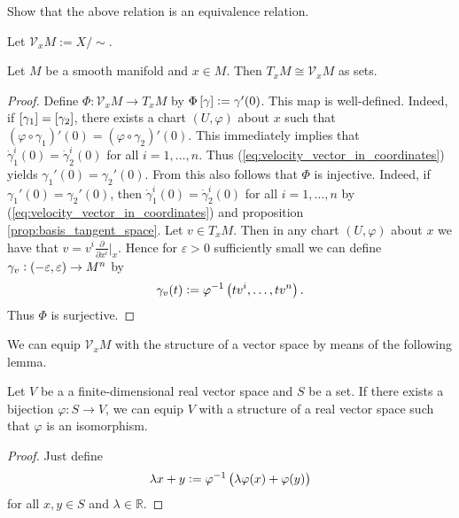 \begin{exercise}
	Show that the above relation is an equivalence relation.
\end{exercise}

Let $\mathcal{V}_xM := X/{\sim}$.

\begin{proposition}
	Let $M$ be a smooth manifold and $x \in M$. Then $T_xM \cong \mathcal{V}_xM$ as sets.
\end{proposition}

\begin{proof}
	Define $\Phi : \mathcal{V}_xM \to T_xM$ by $\Phi\sbr[0]{\gamma} := \gamma'(0)$. This map is well-defined. Indeed, if $\sbr[0]{\gamma_1} = \sbr[0]{\gamma_2}$, there exists a chart $(U,\varphi)$ about $x$ such that $(\varphi \circ \gamma_1)'(0) = (\varphi \circ \gamma_2)'(0)$. This immediately implies that $\dot{\gamma}^i_1(0) = \dot{\gamma}^i_2(0)$ for all $i = 1,\dots,n$. Thus (\ref{eq:velocity_vector_in_coordinates}) yields $\gamma_1'(0) = \gamma_2'(0)$. From this also follows that $\Phi$ is injective. Indeed, if $\gamma_1'(0) = \gamma_2'(0)$, then $\dot{\gamma}_1^i(0) = \dot{\gamma}_2^i(0)$ for all $i = 1,\dots,n$ by (\ref{eq:velocity_vector_in_coordinates}) and proposition \ref{prop:basis_tangent_space}. Let $v \in T_xM$. Then in any chart $(U,\varphi)$ about $x$ we have that $v = v^i\frac{\partial}{\partial x^i}\big\vert_x$. Hence for $\varepsilon > 0$ sufficiently small we can define $\gamma_v : \intoo{-\varepsilon,\varepsilon} \to M^n$ by
	\begin{equation*}
		\gamma_v(t) := \varphi^{-1}\del[1]{tv^i,\dots,tv^n}.
	\end{equation*}
	Thus $\Phi$ is surjective.
\end{proof}

We can equip $\mathcal{V}_xM$ with the structure of a vector space by means of the following lemma.

\begin{lemma}
	Let $V$ be a a finite-dimensional real vector space and $S$ be a set. If there exists a bijection $\varphi : S \to V$, we can equip $V$ with a structure of a real vector space such that $\varphi$ is an isomorphism.
\end{lemma}

\begin{proof}
	Just define 
	\begin{equation*}
		\lambda x + y := \varphi^{-1}\del[1]{\lambda \varphi(x) + \varphi(y)}
	\end{equation*}
	\noindent for all $x,y \in S$ and $\lambda \in \mathbb{R}$.
\end{proof}

